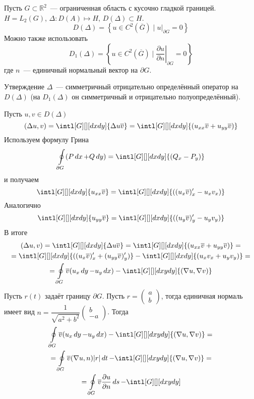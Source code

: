 \documentclass[14pt]{extarticle}
\newcommand{\vect}[2]{\left(
\begin{array}{c}
    #1\\
    #2
\end{array}\right)}
\begin{document}
Пусть $G \subset \mathbb R^2$~--- ограниченная область с кусочно гладкой границей.
$H = L_2(G)$, $\Delta : D(A) \mapsto H$, $D(\Delta) \subset H$.
$$
D(\Delta) = \left\{u \in C^2(\overline{G}) \mid u|_{\partial G} = 0\right\}
$$
Можно также использовать
$$
D_1(\Delta) = \left\{u \in C^2(\overline{G}) \mid \left.\dfrac{\partial u}{\partial n}\right|_{\partial 
G} = 0\right\}
$$
где $n$~--- единичный нормальный вектор на $\partial G$.
\begin{MathCl}{Утверждение}
    $\Delta$~--- симметричный отрицательно определённый оператор на $D(\Delta)$ 
    (на $D_1(\Delta)$ он симметричный и отрицательно полуопределённый).
\end{MathCl}
\begin{Proof}
    Пусть $u, v \in D(\Delta)$
    $$
    (\Delta u, v) = \intl[G][][dxdy]{\Delta u \overline{v}} = 
    \intl[G][][dxdy]{(u_{xx}\overline{v} + u_{yy}\overline{v})}
    $$
    Используем формулу Грина
    $$
    \oint\limits_{\partial G}(P \mathop{dx} + Q \mathop{dy}) = 
    \intl[G][][dxdy]{(Q_x - P_y)}
    $$
    и получаем
    $$
    \intl[G][][dxdy]{u_{xx}\overline{v}} = \intl[G][][dxdy]{((u_x \overline{v})'_x - u_x v_x)}    
    $$
    Аналогично
    $$
    \intl[G][][dxdy]{u_{yy}\overline{v}} = \intl[G][][dxdy]{((u_y \overline{v})'_y - u_y v_y)}    
    $$
    В итоге
    \begin{multline*}
        (\Delta u, v) = \intl[G][][dxdy]{\Delta u \overline{v}} = 
        \intl[G][][dxdy]{(u_{xx}\overline{v} + u_{yy}\overline{v})} =\\=
        \intl[G][][dxdy]{((u_{x}\overline{v})'_x + (u_{yy}\overline{v})'_y)} -
        \intl[G][][dxdy]{(u_x v_x + u_y v_y)} =\\=
        \oint \limits_{\partial G} \overline{v}(u_x \mathop{dy} - u_y \mathop{dx}) - \intl[G][][dxydy]
        {(\nabla u, \nabla v)}
    \end{multline*}
    Пусть $r(t)$ задаёт границу $\partial G$.
    Пусть $r = \vect{a}{b}$, тогда единичная нормаль имеет вид $n =
    \dfrac{1}{\sqrt{a^2 + b^2}}\vect{b}{-a}$.
    Тогда
    \begin{multline*}
    \oint \limits_{\partial G} \overline{v}(u_x \mathop{dy} - u_y \mathop{dx}) - \intl[G][][dxydy]
    {(\nabla u, \nabla v)} =\\=
    \oint \limits_{\partial G} \overline{v} (\nabla u, n)|r|\mathop{dt} - \intl[G][][dxydy]
    {(\nabla u, \nabla v)} =\\=
    \oint \limits_{\partial G} \overline{v} \dfrac{\partial u}{\partial n} \mathop{ds} - \intl[G][][dxydy]

\end{multline*}
\end{Proof}
\end{document}
